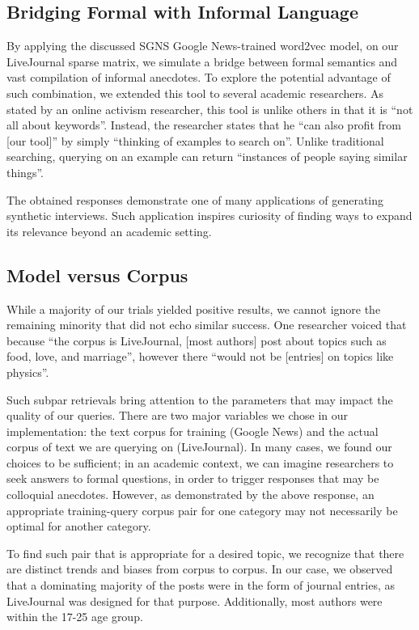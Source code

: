 \documentclass{sigchi}
\begin{document}
\subsection{Bridging Formal with Informal Language}
By applying the discussed SGNS Google News-trained word2vec model, on our LiveJournal sparse matrix, we simulate a bridge between formal semantics and vast compilation of informal anecdotes. To explore the potential advantage of such combination, we extended this tool to several academic researchers. As stated by an online activism researcher, this tool is unlike others in that it is ``not all about keywords''. Instead, the researcher states that he ``can also profit from [our tool]'' by simply ``thinking of examples to search on''. Unlike traditional searching, querying on an example can return ``instances of people saying similar things''. 

The obtained responses demonstrate one of many applications of generating synthetic interviews. Such application inspires curiosity of finding ways to expand its relevance beyond an academic setting. 

\subsection{Model versus Corpus}
While a majority of our trials yielded positive results, we cannot ignore the remaining minority that did not echo similar success. One researcher voiced that because ``the corpus is LiveJournal, [most authors] post about topics such as food, love, and marriage'', however there ``would not be [entries] on topics like physics''. 

Such subpar retrievals bring attention to the parameters that may impact the quality of our queries. There are two major variables we chose in our implementation: the text corpus for training (Google News) and the actual corpus of text we are querying on (LiveJournal). In many cases, we found our choices to be sufficient; in an academic context, we can imagine researchers to seek answers to formal questions, in order to trigger responses that may be colloquial anecdotes. However, as demonstrated by the above response, an appropriate training-query corpus pair for one category may not necessarily be optimal for another category.

To find such pair that is appropriate for a desired topic, we recognize that there are distinct trends and biases from corpus to corpus. In our case, we observed that a dominating majority of the posts were in the form of journal entries, as LiveJournal was designed for that purpose. Additionally, most authors were within the 17-25 age group.
\end{document}
